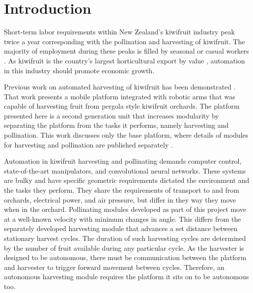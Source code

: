 \documentclass[preprint,authoryear,12pt]{elsarticle}
\begin{document}

\section{Introduction}
\label{sect:intro}
    Short-term labor requirements within New Zealand's kiwifruit industry peak twice a year corresponding with the pollination and harvesting of kiwifruit.
    The majority of employment during these peaks is filled by seasonal or casual workers \citep{Timmins2009}.
    As kiwifruit is the country's largest horticultural export by value \citep{StatisticsNewZealand2015}, automation in this industry should promote economic growth.

    Previous work on automated harvesting of kiwifruit has been demonstrated \citep{Scarfe2012}.
    That work presents a mobile platform integrated with robotic arms that was capable of harvesting fruit from pergola style kiwifruit orchards.
    The platform presented here is a second generation unit that increases modularity by separating the platform from the tasks it performs, namely harvesting and pollination.
    This work discusses only the base platform, where details of modules for harvesting and pollination are published separately \citep{williams2017,Seabright2017}.

    Automation in kiwifruit harvesting and pollinating demands computer control, state-of-the-art manipulators, and convolutional neural networks.
    These systems are bulky and have specific geometric requirements dictated the environment and the tasks they perform.
    They share the requirements of transport to and from orchards, electrical power, and air pressure, but differ in they way they move when in the orchard.
    Pollinating modules developed as part of this project move at a well-known velocity with minimum changes in angle.
    This differs from the separately developed harvesting module that advances a set distance between stationary harvest cycles.
    The duration of such harvesting cycles are determined by the number of fruit available during any particular cycle.
    As the harvester is designed to be autonomous, there must be communication between the platform and harvester to trigger forward movement between cycles.
    Therefore, an autonomous harvesting module requires the platform it sits on to be autonomous too.
\end{document}
